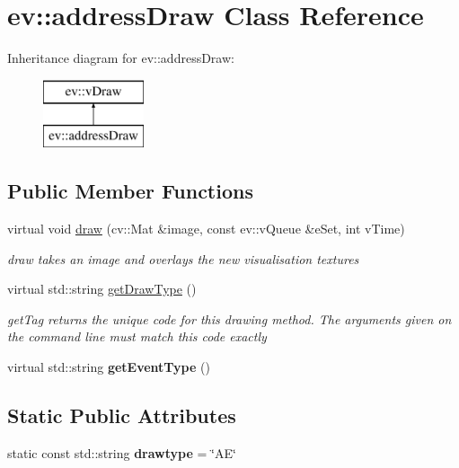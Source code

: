 \hypertarget{classev_1_1addressDraw}{}\section{ev\+:\+:address\+Draw Class Reference}
\label{classev_1_1addressDraw}
Inheritance diagram for ev\+:\+:address\+Draw\+:\begin{figure}[H]
\begin{center}
\leavevmode
\includegraphics[height=2.000000cm]{classev_1_1addressDraw}
\end{center}
\end{figure}
\subsection*{Public Member Functions}
\begin{DoxyCompactItemize}
\item 
virtual void \hyperlink{classev_1_1addressDraw_a9ff5e558766f8b6cec2b11a60907b455}{draw} (cv\+::\+Mat \&image, const ev\+::v\+Queue \&e\+Set, int v\+Time)
\begin{DoxyCompactList}\small\item\em draw takes an image and overlays the new visualisation textures \end{DoxyCompactList}\item 
virtual std\+::string \hyperlink{classev_1_1addressDraw_a92e98d08d1fdbf47d7e0cb9fcf7a9937}{get\+Draw\+Type} ()
\begin{DoxyCompactList}\small\item\em get\+Tag returns the unique code for this drawing method. The arguments given on the command line must match this code exactly \end{DoxyCompactList}\item 
\mbox{\label{classev_1_1addressDraw_a9bc65ede4756bf6a6bcbd10a085eb0cb}} 
virtual std\+::string {\bfseries get\+Event\+Type} ()
\end{DoxyCompactItemize}
\subsection*{Static Public Attributes}
\begin{DoxyCompactItemize}
\item 
\mbox{\label{classev_1_1addressDraw_a224f9727090703d652a8e1ac793ca96e}} 
static const std\+::string {\bfseries drawtype} = \char`\"{}AE\char`\"{}
\end{DoxyCompactItemize}
